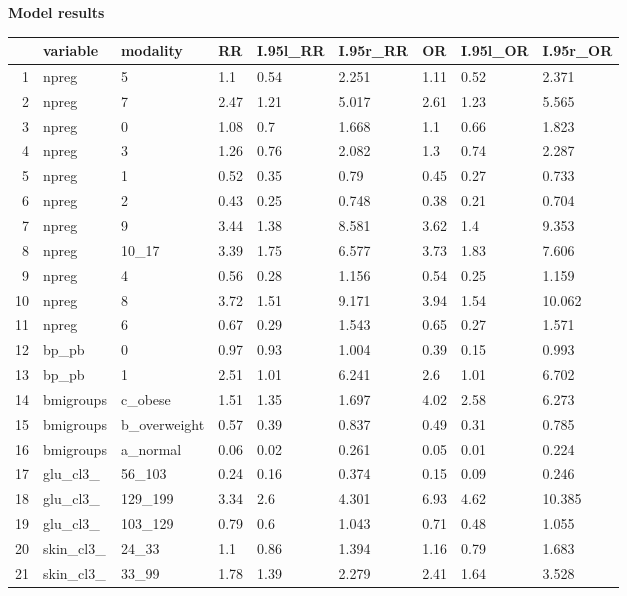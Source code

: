 \documentclass[12pt]{article}
\begin{document}
\newpage
\noindent \textbf{Model results}
\begin{table}[ht]
\centering
\begin{tabular}{rllllllll}
  \hline
 & variable & modality & RR & I.95l\_RR & I.95r\_RR & OR & I.95l\_OR & I.95r\_OR \\ 
  \hline
1 & npreg & 5 & 1.1 & 0.54 & 2.251 & 1.11 & 0.52 & 2.371 \\ 
  2 & npreg & 7 & 2.47 & 1.21 & 5.017 & 2.61 & 1.23 & 5.565 \\ 
  3 & npreg & 0 & 1.08 & 0.7 & 1.668 & 1.1 & 0.66 & 1.823 \\ 
  4 & npreg & 3 & 1.26 & 0.76 & 2.082 & 1.3 & 0.74 & 2.287 \\ 
  5 & npreg & 1 & 0.52 & 0.35 & 0.79 & 0.45 & 0.27 & 0.733 \\ 
  6 & npreg & 2 & 0.43 & 0.25 & 0.748 & 0.38 & 0.21 & 0.704 \\ 
  7 & npreg & 9 & 3.44 & 1.38 & 8.581 & 3.62 & 1.4 & 9.353 \\ 
  8 & npreg & 10\_17 & 3.39 & 1.75 & 6.577 & 3.73 & 1.83 & 7.606 \\ 
  9 & npreg & 4 & 0.56 & 0.28 & 1.156 & 0.54 & 0.25 & 1.159 \\ 
  10 & npreg & 8 & 3.72 & 1.51 & 9.171 & 3.94 & 1.54 & 10.062 \\ 
  11 & npreg & 6 & 0.67 & 0.29 & 1.543 & 0.65 & 0.27 & 1.571 \\ 
  12 & bp\_pb & 0 & 0.97 & 0.93 & 1.004 & 0.39 & 0.15 & 0.993 \\ 
  13 & bp\_pb & 1 & 2.51 & 1.01 & 6.241 & 2.6 & 1.01 & 6.702 \\ 
  14 & bmigroups & c\_obese & 1.51 & 1.35 & 1.697 & 4.02 & 2.58 & 6.273 \\ 
  15 & bmigroups & b\_overweight & 0.57 & 0.39 & 0.837 & 0.49 & 0.31 & 0.785 \\ 
  16 & bmigroups & a\_normal & 0.06 & 0.02 & 0.261 & 0.05 & 0.01 & 0.224 \\ 
  17 & glu\_cl3\_ & 56\_103 & 0.24 & 0.16 & 0.374 & 0.15 & 0.09 & 0.246 \\ 
  18 & glu\_cl3\_ & 129\_199 & 3.34 & 2.6 & 4.301 & 6.93 & 4.62 & 10.385 \\ 
  19 & glu\_cl3\_ & 103\_129 & 0.79 & 0.6 & 1.043 & 0.71 & 0.48 & 1.055 \\ 
  20 & skin\_cl3\_ & 24\_33 & 1.1 & 0.86 & 1.394 & 1.16 & 0.79 & 1.683 \\ 
  21 & skin\_cl3\_ & 33\_99 & 1.78 & 1.39 & 2.279 & 2.41 & 1.64 & 3.528 \\ 

\end{tabular}
\end{table}
\end{document}
